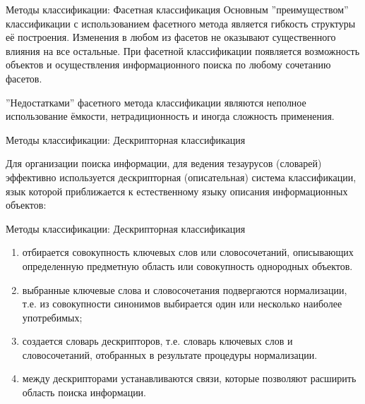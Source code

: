 \documentclass{beamer}
\begin{document}
\begin{frame}{Методы классификации: Фасетная классификация} 
Основным ''преимуществом'' классификации с использованием фасетного метода является гибкость структуры её построения.
 Изменения в любом из фасетов не оказывают существенного влияния на все остальные. 
При фасетной классификации появляется возможность объектов и осуществления
 информационного поиска по любому сочетанию фасетов.

''Недостатками'' фасетного метода классификации являются неполное использование 
ёмкости, нетрадиционность и иногда сложность применения.


\end{frame}


\begin{frame}{Методы классификации: Дескрипторная классификация}

Для организации поиска информации, для ведения тезаурусов (словарей) эффективно используется дескрипторная (описательная) система классификации,
 язык которой приближается к естественному языку описания информационных объектов:   
\end{frame}
 
 \begin{frame}{Методы классификации: Дескрипторная классификация}
 
\begin{enumerate}
\item  отбирается совокупность ключевых слов или словосочетаний, описывающих определенную предметную область или совокупность однородных объектов.
\item  выбранные ключевые слова и словосочетания подвергаются нормализации, т.е. из совокупности синонимов выбирается один или несколько наиболее употребимых;
\item  создается словарь дескрипторов, т.е. словарь ключевых слов и словосочетаний, отобранных в результате процедуры нормализации.
\item  между дескрипторами устанавливаются связи, которые позволяют расширить область поиска информации.

\end{enumerate}

\end{frame}
\end{document}
